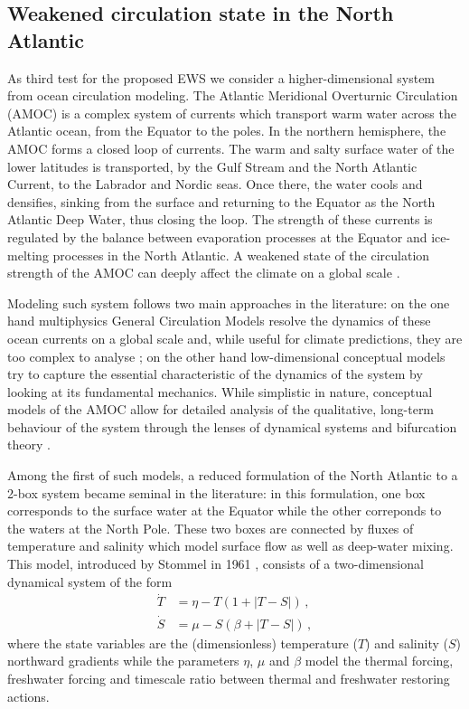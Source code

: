 \documentclass[a4paper,fleqn]{cas-sc}
\begin{document}
\subsection{Weakened circulation state in the North Atlantic}\label{subsec:AMOC}
As third test for the proposed EWS we consider a higher-dimensional system from ocean circulation modeling.
The Atlantic Meridional Overturnic Circulation (AMOC) is a complex system of currents which transport warm water across the Atlantic ocean, from the Equator to the poles.
In the northern hemisphere, the AMOC forms a closed loop of currents.
The warm and salty surface water of the lower latitudes is transported, by the Gulf Stream and the North Atlantic Current, to the Labrador and Nordic seas.
Once there, the water cools and densifies, sinking from the surface and returning to the Equator as the North Atlantic Deep Water, thus closing the loop.
The strength of these currents is regulated by the balance between evaporation processes at the Equator and ice-melting processes in the North Atlantic. 
A weakened state of the circulation strength of the AMOC can deeply affect the climate on a global scale \cite{Sutton2012,vanWesten025b,Dijkstra2026}.

Modeling such system follows two main approaches in the literature: on the one hand multiphysics General Circulation Models resolve the dynamics of these ocean currents on a global scale and, while useful for climate predictions, they are too complex to analyse \cite{vanWesten2023,vanWesten025a}; on the other hand low-dimensional conceptual models try to capture the essential characteristic of the dynamics of the system by looking at its fundamental mechanics.
While simplistic in nature, conceptual models of the AMOC allow for detailed analysis of the qualitative, long-term behaviour of the system through the lenses of dynamical systems and bifurcation theory \cite{Alkhayuon2019,Mancini2026}.

Among the first of such models, a reduced formulation of the North Atlantic to a 2-box system became seminal in the literature: in this formulation, one box corresponds to the surface water at the Equator while the other correponds to the waters at the North Pole.
These two boxes are connected by fluxes of temperature and salinity which model surface flow as well as deep-water mixing.
This model, introduced by Stommel in 1961 \cite{Stommel1961}, consists of a two-dimensional dynamical system of the form
%
\begin{equation}
        \begin{aligned}\label{eq:stommel_model}
                \dot{T} &= \eta - T(1 + |T-S|)\,,\\
                \dot{S} &= \mu - S(\beta + |T-S|)\,,
        \end{aligned}
\end{equation}
%
where the state variables are the (dimensionless) temperature ($T$) and salinity ($S$) northward gradients while the parameters $\eta$, $\mu$ and $\beta$ model the thermal forcing, freshwater forcing and timescale ratio between thermal and freshwater restoring actions.
\end{document}
